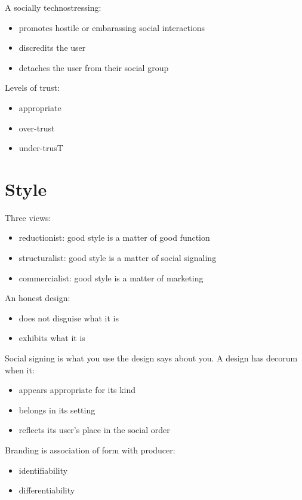 \documentclass{article}
\begin{document}
A socially technostressing:
\begin{itemize}
	\item promotes hostile or embarassing social interactions
	\item discredits the user
	\item detaches the user from their social group
\end{itemize}

Levels of trust:
\begin{itemize}
	\item appropriate
	\item over-trust
	\item under-trusT
\end{itemize}

\section*{Style}
\label{sec:style}

Three views:
\begin{itemize}
	\item reductionist: good style is a matter of good function
	\item structuralist: good style is a matter of social signaling
	\item commercialist: good style is a matter of marketing
\end{itemize}

An honest design:
\begin{itemize}
	\item does not disguise what it is
	\item exhibits what it is
\end{itemize}

Social signing is what you use the design says about you. A design has decorum when it:
\begin{itemize}
	\item appears appropriate for its kind
	\item belongs in its setting
	\item reflects its user's place in the social order
\end{itemize}

Branding is association of form with producer:
\begin{itemize}
	\item identifiability
	\item differentiability
\end{itemize}
\end{document}
